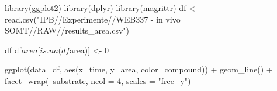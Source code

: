 



library(ggplot2)
library(dplyr)
library(magrittr)
df <- read.csv("IPB//Experimente//WEB337 - in vivo SOMT//RAW//results_area.csv")

df %
df$area[is.na(df$area)] <- 0

ggplot(data=df, aes(x=time, y=area, color=compound)) + geom_line() + facet_wrap(~substrate, ncol = 4, scales = "free_y")

